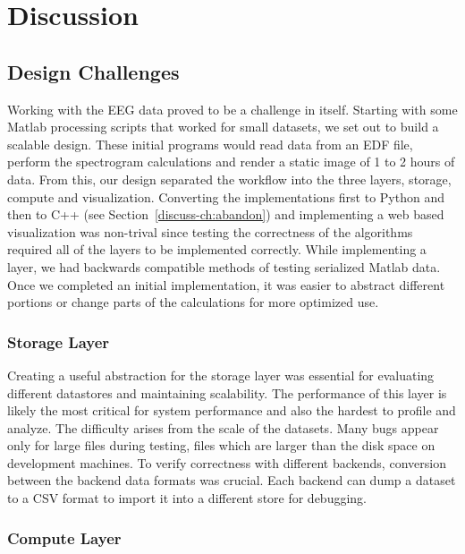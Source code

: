 \chapter{Discussion}\label{discuss-ch}

\section{Design Challenges}

Working with the EEG data proved to be a challenge in itself. Starting with
some Matlab processing scripts that worked for small datasets, we set out to
build a scalable design. These initial programs would read data from an EDF
file, perform the spectrogram calculations and render a static image of 1 to 2
hours of data. From this, our design separated the workflow into the three
layers, storage, compute and visualization. Converting the implementations
first to Python and then to C++ (see Section~\ref{discuss-ch:abandon}) and
implementing a web based visualization was non-trival since testing the
correctness of the algorithms required all of the layers to be implemented
correctly. While implementing a layer, we had backwards compatible methods of
testing serialized Matlab data. Once we completed an initial implementation, it
was easier to abstract different portions or change parts of the calculations
for more optimized use. \\

\subsection{Storage Layer}

Creating a useful abstraction for the storage layer was essential for
evaluating different datastores and maintaining scalability. The performance of
this layer is likely the most critical for system performance and also the
hardest to profile and analyze. The difficulty arises from the scale of the
datasets. Many bugs appear only for large files during testing, files which are
larger than the disk space on development machines. To verify correctness with
different backends, conversion between the backend data formats was crucial.
Each backend can dump a dataset to a CSV format to import it into a different
store for debugging.

\subsection{Compute Layer}

